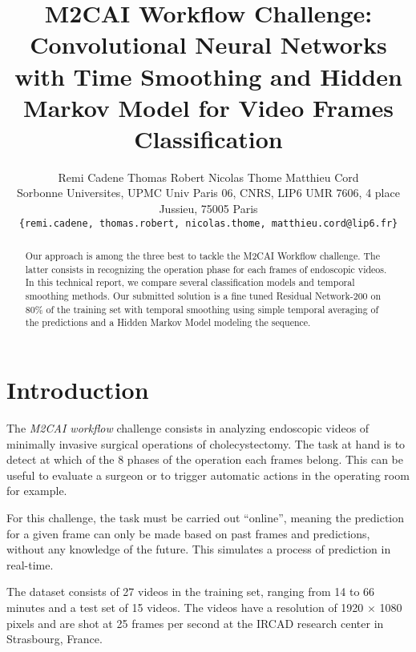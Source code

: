 \documentclass[10pt,twocolumn,letterpaper]{article}
\begin{document}
\title{M2CAI Workflow Challenge: Convolutional Neural Networks with Time Smoothing and Hidden Markov Model for Video Frames Classification}

\author{Remi Cadene \hspace{1cm} Thomas Robert \hspace{1cm} Nicolas Thome \hspace{1cm} Matthieu Cord\\
Sorbonne Universites, UPMC Univ Paris 06, CNRS, LIP6 UMR 7606, 4 place Jussieu, 75005 Paris\\
{\tt\small \{remi.cadene, thomas.robert, nicolas.thome, matthieu.cord@lip6.fr\}}
}

\maketitle

\begin{abstract}
Our approach is among the three best to tackle the M2CAI Workflow challenge. The latter consists in recognizing the operation phase for each frames of endoscopic videos. In this technical report, we compare several classification models and temporal smoothing methods. Our submitted solution is a fine tuned Residual Network-200 on 80\% of the training set with temporal smoothing using simple temporal averaging of the predictions and a Hidden Markov Model modeling the sequence.
\end{abstract}

\section{Introduction}

The \emph{M2CAI workflow} challenge \cite{twinanda2016endonet, sahu2016, dergachyova2016, jin2016} consists in analyzing endoscopic videos of
minimally invasive surgical operations of cholecystectomy. The task at hand is
to detect at which of the 8 phases of the operation each frames belong. This can
be useful to evaluate a surgeon or to trigger automatic actions in the operating
room for example.

For this challenge, the task must be carried out ``online'', meaning the prediction
for a given frame can only be made based on past frames and predictions, without
any knowledge of the future. This simulates a process of prediction in real-time.

The dataset \cite{Stauder2016} consists of 27 videos in the training set, ranging from 14 to 66
minutes and a test set of 15 videos. The videos have a resolution of 1920 $\times$
1080 pixels and are shot at 25 frames per second at the IRCAD research center in
Strasbourg, France.
\end{document}
